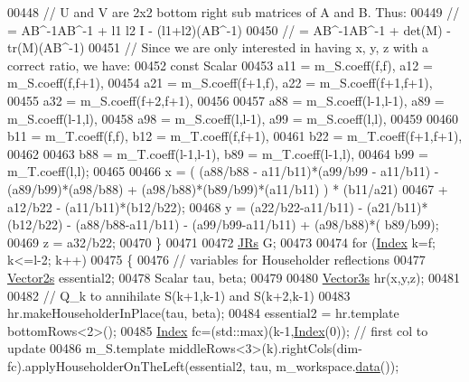 \begin{DoxyCode}
00448         \textcolor{comment}{// U and V are 2x2 bottom right sub matrices of A and B. Thus:}
00449         \textcolor{comment}{//  = AB^-1AB^-1 + l1 l2 I - (l1+l2)(AB^-1)}
00450         \textcolor{comment}{//  = AB^-1AB^-1 + det(M) - tr(M)(AB^-1)}
00451         \textcolor{comment}{// Since we are only interested in having x, y, z with a correct ratio, we have:}
00452         \textcolor{keyword}{const} Scalar
00453           a11 = m\_S.coeff(f,f),     a12 = m\_S.coeff(f,f+1),
00454           a21 = m\_S.coeff(f+1,f),   a22 = m\_S.coeff(f+1,f+1),
00455                                     a32 = m\_S.coeff(f+2,f+1),
00456 
00457           a88 = m\_S.coeff(l-1,l-1), a89 = m\_S.coeff(l-1,l),
00458           a98 = m\_S.coeff(l,l-1),   a99 = m\_S.coeff(l,l),
00459 
00460           b11 = m\_T.coeff(f,f),     b12 = m\_T.coeff(f,f+1),
00461                                     b22 = m\_T.coeff(f+1,f+1),
00462 
00463           b88 = m\_T.coeff(l-1,l-1), b89 = m\_T.coeff(l-1,l),
00464                                     b99 = m\_T.coeff(l,l);
00465 
00466         x = ( (a88/b88 - a11/b11)*(a99/b99 - a11/b11) - (a89/b99)*(a98/b88) + (a98/b88)*(b89/b99)*(a11/b11)
       ) * (b11/a21)
00467           + a12/b22 - (a11/b11)*(b12/b22);
00468         y = (a22/b22-a11/b11) - (a21/b11)*(b12/b22) - (a88/b88-a11/b11) - (a99/b99-a11/b11) + (a98/b88)*(
      b89/b99);
00469         z = a32/b22;
00470       \}
00471 
00472       \hyperlink{group___jacobi___module_class_eigen_1_1_jacobi_rotation}{JRs} G;
00473 
00474       \textcolor{keywordflow}{for} (\hyperlink{group___eigenvalues___module_a6201e534e901b5f4e66f72c176b534a3}{Index} k=f; k<=l-2; k++)
00475       \{
00476         \textcolor{comment}{// variables for Householder reflections}
00477         \hyperlink{group___core___module_class_eigen_1_1_matrix}{Vector2s} essential2;
00478         Scalar tau, beta;
00479 
00480         \hyperlink{group___core___module}{Vector3s} hr(x,y,z);
00481 
00482         \textcolor{comment}{// Q\_k to annihilate S(k+1,k-1) and S(k+2,k-1)}
00483         hr.makeHouseholderInPlace(tau, beta);
00484         essential2 = hr.template bottomRows<2>();
00485         \hyperlink{group___eigenvalues___module_a6201e534e901b5f4e66f72c176b534a3}{Index} fc=(std::max)(k-1,\hyperlink{group___eigenvalues___module_a6201e534e901b5f4e66f72c176b534a3}{Index}(0));  \textcolor{comment}{// first col to update}
00486         m\_S.template middleRows<3>(k).rightCols(dim-fc).applyHouseholderOnTheLeft(essential2, tau, 
      m\_workspace.\hyperlink{class_eigen_1_1_plain_object_base_ac25699535374b1854cf8494e44ad31b2}{data}());

\end{DoxyCode}
